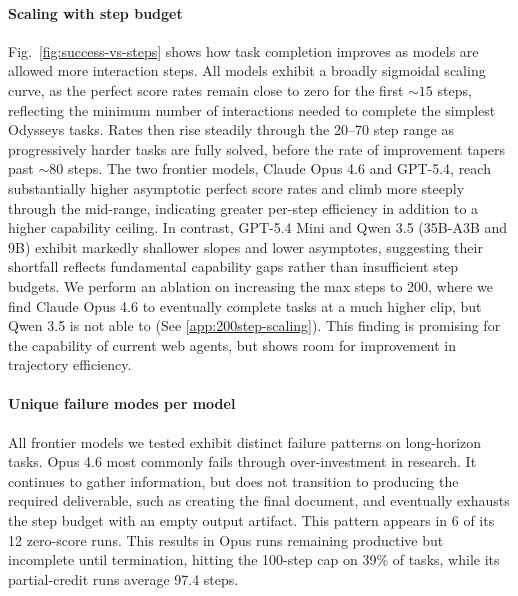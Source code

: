 \documentclass{article}
\theoremstyle{plain}
\theoremstyle{definition}
\theoremstyle{remark}
\def\odysseys{Odysseys\xspace}
\begin{document}
\paragraph{Scaling with step budget} Fig.~\ref{fig:success-vs-steps} shows how task completion improves as models are allowed more interaction steps. All models exhibit a broadly sigmoidal scaling curve, as the perfect score rates remain close to zero for the first ${\sim}15$ steps, reflecting the minimum number of interactions needed to complete the simplest \odysseys tasks. Rates then rise steadily through the 20--70 step range as progressively harder tasks are fully solved, before the rate of improvement tapers past ${\sim}80$ steps. The two frontier models, Claude Opus 4.6 and GPT-5.4, reach substantially higher asymptotic perfect score rates and climb more steeply through the mid-range, indicating greater per-step efficiency in addition to a higher capability ceiling. In contrast, GPT-5.4 Mini and Qwen 3.5 (35B-A3B and 9B) exhibit markedly shallower slopes and lower asymptotes, suggesting their shortfall reflects fundamental capability gaps rather than insufficient step budgets. We perform an ablation on increasing the max steps to  200, where we find Claude Opus 4.6 to eventually complete tasks at a much higher clip, but Qwen 3.5 is not able to (See \ref{app:200step-scaling}). This finding is promising for the capability of current web agents, but shows room for improvement in trajectory efficiency.

\paragraph{Unique failure modes per model}
All frontier models we tested exhibit distinct failure patterns on long-horizon tasks. Opus 4.6 most commonly fails through over-investment in research. It continues to gather information, but does not transition to producing the required deliverable, such as creating the final document, and eventually exhausts the step budget with an empty output artifact. This pattern appears in 6 of its 12 zero-score runs. This results in Opus runs remaining productive but incomplete until termination, hitting the 100-step cap on 39\% of tasks, while its partial-credit runs average 97.4 steps.
\end{document}
